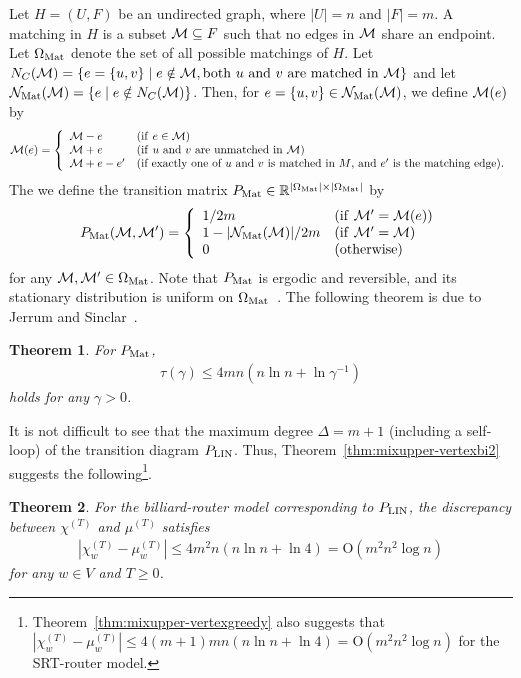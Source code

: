 \documentclass[letter, 11pt]{article}
\newcommand{\Order}{\mathrm{O}}
\newcommand{\1}{\mbox{1}\hspace{-0.25em}\mbox{l}}
\newtheorem{theorem}{Theorem}[section]
\begin{document}
Let $H=(U,F)$ be an undirected graph, where $|U|=n$ and $|F|=m$. 
A matching in $H$ is a subset ${\cal M}\subseteq F$ such that no edges in ${\cal M}$ share an endpoint. 
Let $\Omega_{\rm Mat}$ denote the set of all possible matchings of $H$. 
Let $N_C({\cal M})=\{e=\{u,v\}\mid e\notin {\cal M}, {\rm both}\ u\ {\rm and}\ v\ {\rm are\ matched\ in}\ {\cal M}\}$
and let ${\cal N}_{\rm Mat}({\cal M})=\{e\mid e\notin N_C({\cal M})\}$.
Then, for $e=\{u,v\}\in {\cal N}_{\rm Mat}({\cal M})$, we define ${\cal M}(e)$ by 
\begin{eqnarray*}
{\cal M}(e)=\left\{ \begin{array}{ll}
{\cal M}-e & ({\rm if}\ e\in {\cal M}) \\
{\cal M}+e & ({\rm if}\ u\ {\rm and}\ v\ {\rm are\ unmatched\ in}\ {\cal M}) \\
{\cal M}+e-e' & (\mbox{if exactly one of $u$ and $v$ is matched in $M$, and $e'$ is the matching edge}). 
\end{array} \right.
\end{eqnarray*}
The we define the transition matrix $P_{\rm Mat}\in \mathbb{R}^{|\Omega_{\rm Mat}| \times |\Omega_{\rm Mat}|}$ by 
\begin{eqnarray*}
P_{\rm Mat}({\cal M},{\cal M}')=\left\{ \begin{array}{ll}
1/2m & ({\rm if}\ {\cal M}'={\cal M}(e)) \\
1-|{\cal N}_{\rm Mat}({\cal M})|/2m & ({\rm if}\ {\cal M}'={\cal M}) \\
0 & ({\rm otherwise}) \\ 
\end{array} \right.
\end{eqnarray*}
for any ${\cal M},{\cal M}'\in \Omega_{\rm Mat}$. 
Note that $P_{\rm Mat}$ is ergodic and reversible, and 
  its stationary distribution is uniform on $\Omega_{\rm Mat}$~\cite{JS96}. 
The following theorem is due to Jerrum and Sinclar~\cite{JS96}.  
\begin{theorem}
\cite{JS96}
\label{thm:matchmix}
For $P_{\rm Mat}$, \begin{eqnarray*}
\tau (\gamma )\leq 4mn(n\ln n +\ln \gamma ^{-1})
\end{eqnarray*}
holds for any $\gamma >0$. 
\end{theorem}

 It is not difficult to see that the maximum degree $\Delta = m+1$ (including a self-loop) 
   of the transition diagram $P_{\rm LIN}$. 
 Thus, Theorem~\ref{thm:mixupper-vertexbi2} suggests the following\footnote{
   Theorem~\ref{thm:mixupper-vertexgreedy} also suggests that 
$|\chi_w^{(T)}-\mu_w^{(T)} | \leq 4(m+1)mn(n\ln n +\ln 4) = \Order(m^2 n^2 \log n)$ 
for the SRT-router model.  }. 
\begin{theorem}\label{thm:matchingupper}
For the billiard-router model corresponding to $P_{\rm LIN}$, 
 the discrepancy between $\chi^{(T)}$ and $\mu^{(T)}$ satisfies
\begin{eqnarray*}
\left|\chi_w^{(T)}-\mu_w^{(T)}\right| 
\leq 4m^2 n(n\ln n +\ln 4)
= \Order(m^2 n^2 \log n)
\end{eqnarray*}
for any $w\in V$ and $T\geq 0$. 
\end{theorem}
\end{document}

